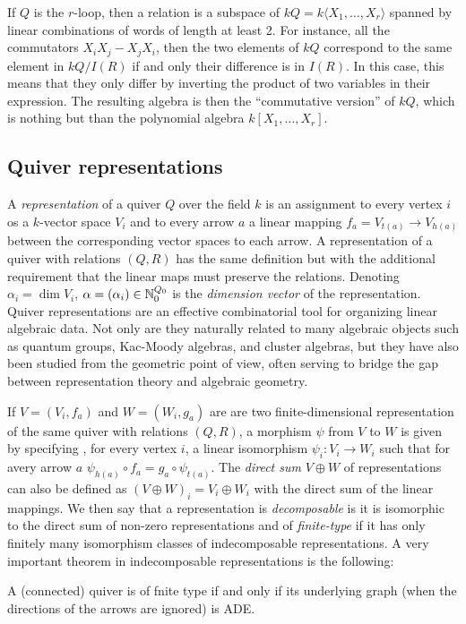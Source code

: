         \begin{examp*}
            If $Q$ is the $r$-loop, then a relation is a subspace of $kQ = k\langle X_1,\dots,X_r\rangle$ spanned by linear combinations of words of length at least 2. For instance, all the commutators $X_iX_j-X_jX_i$, then the two elements of $kQ$ correspond to the same element in $kQ/I(R)$ if and only their difference is in $I(R)$. In this case, this means that they only differ by inverting the product of two variables in their expression. The resulting algebra is then the ``commutative version'' of $kQ$, which is nothing but than the polynomial algebra $k[X_1,\dots,X_r]$.
        \end{examp*}

    \subsection{Quiver representations}

        A \emph{representation} of a quiver $Q$ over the field $k$ is an assignment to every vertex $i$ os a $k$-vector space $V_i$ and to every arrow $a$ a linear mapping $f_a=V_{t(a)}\to V_{h(a)}$ between the corresponding vector spaces to each arrow. A representation of a quiver with relations $(Q,R)$ has the same definition but with the additional requirement that the linear maps must preserve the relations\marker. Denoting $\alpha_i=\dim V_i$, $\alpha=(\alpha_i)\in\mathbb{N}^{Q_0}_0$ is the \emph{dimension vector} of the representation. Quiver representations are an effective combinatorial tool for organizing linear algebraic data. Not only are they naturally related to many algebraic objects such as quantum groups, Kac-Moody algebras, and cluster algebras, but they have also been studied from the geometric point of view, often serving to bridge the gap between representation theory and algebraic geometry. 
        
        If $V=(V_i,f_a)$ and $W=(W_i,g_a)$ are are two finite-dimensional representation of the same quiver with relations $(Q,R)$, a morphism $\psi$ from $V$ to $W$ is given by specifying , for every vertex $i$, a linear isomorphism $\psi_i:V_i\to W_i$ such that for avery arrow $a$ $\psi_{h(a)}\circ f_a=g_a\circ\psi_{t(a)}$. The \emph{direct sum} $V\oplus W$ of representations can also be defined as $(V\oplus W)_i=V_i\oplus W_i$ with the direct sum of the linear mappings. We then say that a representation is \emph{decomposable} is it is isomorphic to the direct sum of non-zero representations and of \emph{finite-type} if it has only finitely many isomorphism classes of indecomposable representations. A very important theorem in indecomposable representations is the following:
        \begin{theorem*}[Gabriel]
            A (connected) quiver is of fnite type if and only if its underlying graph (when the directions of the arrows are ignored) is ADE.
        \end{theorem*}
        
